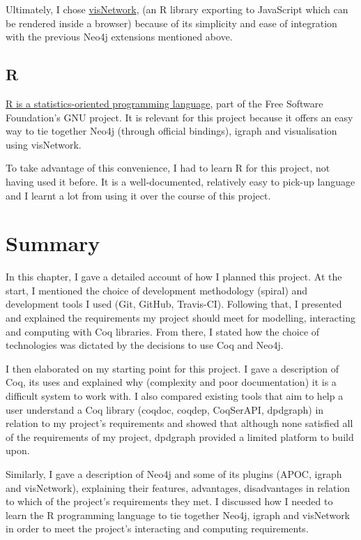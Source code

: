 Ultimately, I chose
\href{http://datastorm-open.github.io/visNetwork}{visNetwork}, (an R library
exporting to JavaScript which can be rendered inside a browser) because of its
simplicity and ease of integration with the previous Neo4j extensions mentioned
above.

\subsection{R}\label{subsec:R}

\href{http://www.r-project.org}{R is a statistics-oriented programming
language}, part of the Free Software Foundation's GNU project. It is relevant for
this project because it offers an easy way to tie together Neo4j (through
official bindings), igraph and visualisation using visNetwork.

To take advantage of this convenience, I had to learn R for this project, not
having used it before. It is a well-documented, relatively easy to pick-up
language and I learnt a lot from using it over the course of this project.

\newpage
\section{Summary}

In this chapter, I gave a detailed account of how I planned this project. At the
start, I mentioned the choice of development methodology (spiral) and
development tools I used (Git, GitHub, Travis-CI). Following that, I presented
and explained the requirements my project should meet for modelling, interacting
and computing with Coq libraries. From there, I stated how the choice of
technologies was dictated by the decisions to use Coq and Neo4j.

I then elaborated on my starting point for this project. I gave a description of
Coq, its uses and explained why (complexity and poor documentation) it is a
difficult system to work with. I also compared existing tools that aim to help
a user understand a Coq library (coqdoc, coqdep, CoqSerAPI, dpdgraph) in
relation to my project's requirements and showed that although none satisfied
all of the requirements of my project, dpdgraph provided a limited platform to
build upon.

Similarly, I gave a description of Neo4j and some of its plugins (APOC, igraph
and visNetwork), explaining their features, advantages, disadvantages in
relation to which of the project's requirements they met. I discussed how I
needed to learn the R programming language to tie together Neo4j, igraph and
visNetwork in order to meet the project's interacting and computing
requirements.

